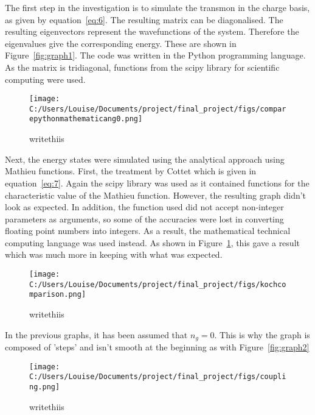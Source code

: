 \documentclass[11pt]{article}
\begin{document}
The first step in the investigation is to simulate the transmon in the charge basis, as given by equation~\ref{eq:6}. The resulting matrix can be diagonalised. The resulting eigenvectors represent the wavefunctions of the system. Therefore the eigenvalues give the corresponding energy. These are shown in Figure~\ref{fig:graph1}. The code was written in the Python programming language. As the matrix is tridiagonal, functions from the scipy library for scientific computing were used.
\begin{figure}
\centering
\texttt{[image: C:/Users/Louise/Documents/project/final\_project/figs/comparepythonmathematicang0.png]}
\caption{writethiis}
\label{fig:graph3}
\end{figure}
Next, the energy states were simulated using the analytical approach using Mathieu functions. First, the treatment by Cottet which is given in equation~\ref{eq:7}. Again the scipy library was used as it contained functions for the characteristic value of the Mathieu function. However, the resulting graph didn't look as expected. In addition, the function used did not accept non-integer parameters as arguments, so some of the accuracies were lost in converting floating point numbers into integers. As a result, the mathematical technical computing language was used instead. As shown in Figure~\ref{fig:graph3}, this gave a result which was much more in keeping with what was expected.
\begin{figure}
\centering
\texttt{[image: C:/Users/Louise/Documents/project/final\_project/figs/kochcomparison.png]}
\caption{writethiis}
\label{fig:graph4}
\end{figure}

In the previous graphs, it has been assumed that $n_g = 0$. This is why the graph is composed of 'steps' and isn't smooth at the beginning as with Figure~\ref{fig:graph2}

\begin{figure}
\centering
\texttt{[image: C:/Users/Louise/Documents/project/final\_project/figs/coupling.png]}
\caption{writethiis}
\label{fig:graph5}
\end{figure}
\end{document}
